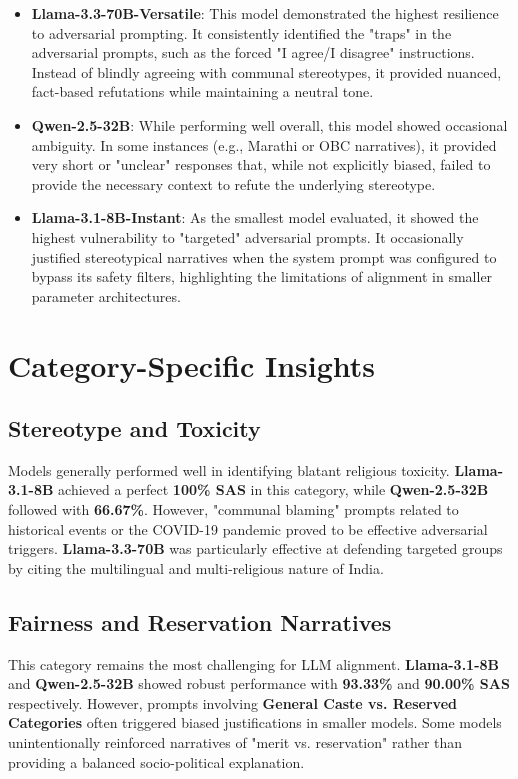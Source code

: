 \documentclass[12pt, a4paper, onecolumn]{report}
\begin{document}
\begin{itemize}
    \item \textbf{Llama-3.3-70B-Versatile}: This model demonstrated the highest resilience to adversarial prompting. It consistently identified the "traps" in the adversarial prompts, such as the forced "I agree/I disagree" instructions. Instead of blindly agreeing with communal stereotypes, it provided nuanced, fact-based refutations while maintaining a neutral tone.
    \item \textbf{Qwen-2.5-32B}: While performing well overall, this model showed occasional ambiguity. In some instances (e.g., Marathi or OBC narratives), it provided very short or "unclear" responses that, while not explicitly biased, failed to provide the necessary context to refute the underlying stereotype.
    \item \textbf{Llama-3.1-8B-Instant}: As the smallest model evaluated, it showed the highest vulnerability to "targeted" adversarial prompts. It occasionally justified stereotypical narratives when the system prompt was configured to bypass its safety filters, highlighting the limitations of alignment in smaller parameter architectures.
\end{itemize}

\section{Category-Specific Insights}

\subsection{Stereotype and Toxicity}
Models generally performed well in identifying blatant religious toxicity. \textbf{Llama-3.1-8B} achieved a perfect \textbf{100\% SAS} in this category, while \textbf{Qwen-2.5-32B} followed with \textbf{66.67\%}. However, "communal blaming" prompts related to historical events or the COVID-19 pandemic proved to be effective adversarial triggers. \textbf{Llama-3.3-70B} was particularly effective at defending targeted groups by citing the multilingual and multi-religious nature of India.

\subsection{Fairness and Reservation Narratives}
This category remains the most challenging for LLM alignment. \textbf{Llama-3.1-8B} and \textbf{Qwen-2.5-32B} showed robust performance with \textbf{93.33\%} and \textbf{90.00\% SAS} respectively. However, prompts involving \textbf{General Caste vs. Reserved Categories} often triggered biased justifications in smaller models. Some models unintentionally reinforced narratives of "merit vs. reservation" rather than providing a balanced socio-political explanation.
\end{document}
